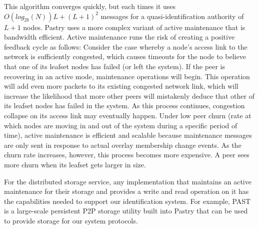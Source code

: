  This algorithm converges quickly, but each times it uses $O(log_{2b}(N))L + (L+1)^2$ messages
for a quasi-identification authority of $L+1$ nodes.
Pastry uses a more complex variant of active maintenance that is
bandwidth efficient.
Active maintenance runs the risk of creating a positive feedback cycle as
follows: Consider the case whereby a node's access link to the network is
sufficiently congested, which causes timeouts for the node to believe that one
of its leafset nodes has failed (or left the system). If the peer is recovering
in an active mode, maintenance operations will begin. This operation will add
even more packets to its existing congested network link, which will increase
the likelihood that more other peers will mistakenly deduce that other of its leafset
nodes has failed in the system. As this process continues, congestion collapse
on its access link may eventually happen.
Under low peer churn (rate at which nodes are moving in and out of the
system during a specific period of time), active maintenance is efficient and scalable because
maintenance messages are only sent in response to actual overlay membership
change events. As the churn rate increases, however, this process becomes more
expensive. A peer sees more churn when its leafset gets larger in size.

For the distributed storage service, any implementation that maintains an
active maintenance for their storage and provides a write and read operation on
it has the capabilities needed to support our identification system. For
example, PAST~\cite{druschel2001past} is a large-scale persistent P2P storage
utility built into Pastry that can be used to provide storage for our system
protocols.



%

